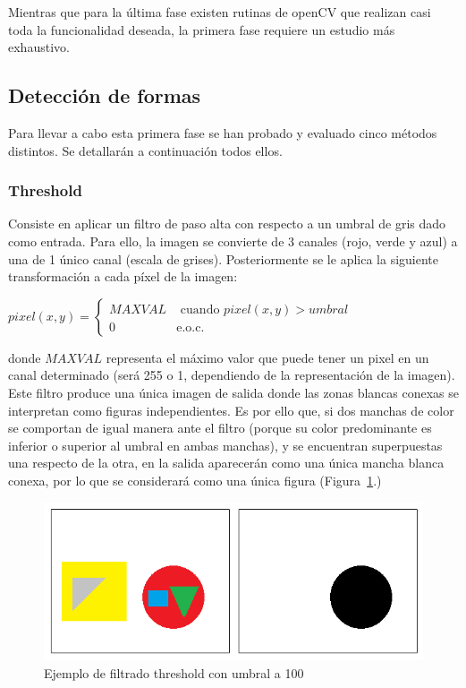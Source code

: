 {	Mientras que para la última fase existen rutinas de openCV que realizan casi toda la funcionalidad deseada, la primera fase requiere un estudio más exhaustivo.\\
	
	\subsection{Detección de formas}
	
	Para llevar a cabo esta primera fase se han probado y evaluado cinco métodos distintos. Se detallarán a continuación todos ellos.
	
	\subsubsection{Threshold}
	
	Consiste en aplicar un filtro de paso alta con respecto a un umbral de gris dado como entrada. Para ello, la imagen se convierte de 3 canales (rojo, verde y azul) a una de 1 único canal (escala de grises). Posteriormente se le aplica la siguiente transformación a cada píxel de la imagen:

	\begin{center}
		$pixel(x,y) = \left\{
		\begin{array}{cc}
		MAXVAL 	& \text{ cuando } pixel(x,y) > umbral\\ 
		0 	    & 	\text{e.o.c.}
		\end{array}\right.$
	\end{center}

	donde $MAXVAL$ representa el máximo valor que puede tener un pixel en un canal determinado (será 255 o 1, dependiendo de la representación de la imagen).\\
	
	Este filtro produce una única imagen de salida donde las zonas blancas conexas se interpretan como figuras independientes. Es por ello que, si dos manchas de color se comportan de igual manera ante el filtro (porque su color predominante es inferior o superior al umbral en ambas manchas), y se encuentran superpuestas una respecto de la otra, en la salida aparecerán como una única mancha blanca conexa, por lo que se considerará como una única figura (Figura~\ref{fig:threshold1}.)\\
	
		\begin{figure}[!htbp]
		\centering
		\includegraphics[scale=0.47]{graphics/threshold1.png}
		\caption{Ejemplo de filtrado threshold con umbral a 100}
		\label{fig:threshold1}
		\end{figure}
		
}
